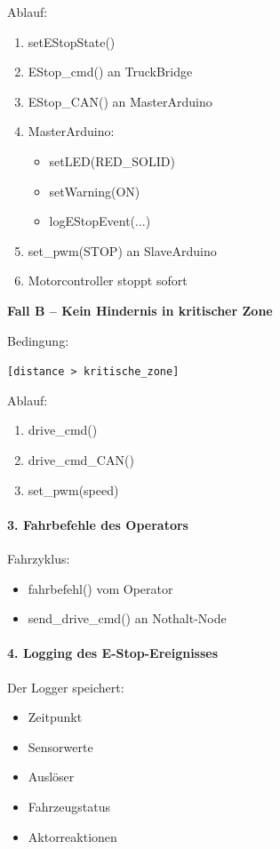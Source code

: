 Ablauf:
\begin{enumerate}
    \item setEStopState()
    \item EStop\_cmd() an TruckBridge
    \item EStop\_CAN() an MasterArduino
    \item MasterArduino:
    \begin{itemize}
        \item setLED(RED\_SOLID)
        \item setWarning(ON)
        \item logEStopEvent(...)
    \end{itemize}
    \item set\_pwm(STOP) an SlaveArduino
    \item Motorcontroller stoppt sofort
\end{enumerate}

\textbf{Fall B – Kein Hindernis in kritischer Zone}

Bedingung:
\begin{description}
    \item[\texttt{[distance > kritische\_zone]}]
\end{description}

Ablauf:
\begin{enumerate}
    \item drive\_cmd()
    \item drive\_cmd\_CAN()
    \item set\_pwm(speed)
\end{enumerate}

\paragraph{3. Fahrbefehle des Operators}

\quad Fahrzyklus:
\begin{itemize}
    \item fahrbefehl() vom Operator
    \item send\_drive\_cmd() an Nothalt-Node
\end{itemize}

\paragraph{4. Logging des E-Stop-Ereignisses}

\quad Der Logger speichert:
\begin{itemize}
    \item Zeitpunkt
    \item Sensorwerte
    \item Auslöser
    \item Fahrzeugstatus
    \item Aktorreaktionen
\end{itemize}

